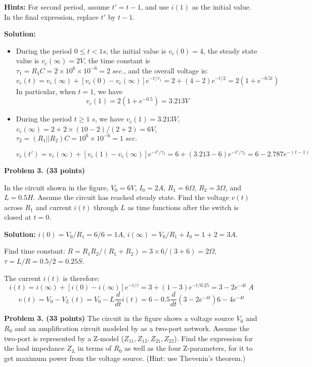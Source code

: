 \begin{enumerate}
{\bf Hints:} For second period, assume $t'=t-1$, and use $i(1)$ as 
the initial value. In the final expression, replace $t'$ by $t-1$.


 {\bf Solution:}
 \begin{itemize}
 \item During the period $0\le t<1 s$, the initial value is 
	$v_c(0)=4$, the steady state value is $v_c(\infty)=2V$, the time 
	constant is $\tau_1=R_1C=2\times 10^6\times 10^{-6}=2\;sec.$, and 
	the overall voltage is:
\[ v_c(t)=v_c(\infty)+[v_c(0)-v_c(\infty)] e^{-t/\tau_1}
	=2+(4-2) e^{-t/2}=2(1+e^{-0.5t})	\]
 In particular, when $t=1$, we have
 \[ v_c(1)=2(1+e^{-0.5})=3.213V	\]
 
 \item During the period $t \ge 1\;s$, we have $v_c(1)=3.213V$, 
 	$v_c(\infty)=2+2\times (10-2)/(2+2)=6V$,
 	$\tau_2=(R_1||R_2)C=10^6 \times 10^{-6}=1\; sec.$

 \[	v_c(t')=v_c(\infty)+[v_c(1)-v_c(\infty)]e^{-t'/\tau_2}
 	=6+(3.213-6)e^{-t'/\tau_2}=6-2.787e^{-(t-1)} \]

 
 \end{itemize}




\end{enumerate}



\item {\bf Problem 3. (33 points)} 

In the circuit shown in the figure, $V_0=6V$, $I_0=2A$, $R_1=6\Omega$, 
$R_2=3\Omega$, and $L=0.5H$. Assume the circuit has reached steady state.
Find the voltage $v(t)$ across $R_1$ and current $i(t)$ through $L$ as 
time functions after the switch is closed at $t=0$.


{\bf Solution:} 
$i(0)=V_0/R_1=6/6=1A$, $i(\infty)=V_0/R_1+I_0=1+2=3A$. 

Find time constant: $R=R_1R_2/(R_1+R_2)=3\times 6/(3+6)=2\Omega$,
$\tau=L/R=0.5/2=0.25S$. 

The current $i(t)$ is therefore:
\[ i(t)=i(\infty)+[i(0)-i(\infty)]e^{-t/\tau}=3+(1-3)e^{-t/0.25}
	=3-2e^{-4t} \;A \]
\[ v(t)=V_0-V_L(t)=V_0-L\frac{d}{dt}i(t)=6-0.5 \frac{d}{dt}(3-2e^{-4t})
	6-4e^{-4t} \]


\item {\bf Problem 3. (33 points)} 
The circuit in the figure shows a voltage source $V_0$ and $R_0$ and an
amplification circuit modeled by as a two-port network. Assume the two-port 
is represented by a Z-model ($Z_{11}, Z_{12}, Z_{21}, Z_{22}$). Find the 
expression for the load impedance $Z_L$ in terms of $R_0$ as well as the
four Z-parameters, for it to get maximum power from the voltage source.
(Hint: use Thevenin's theorem.)

